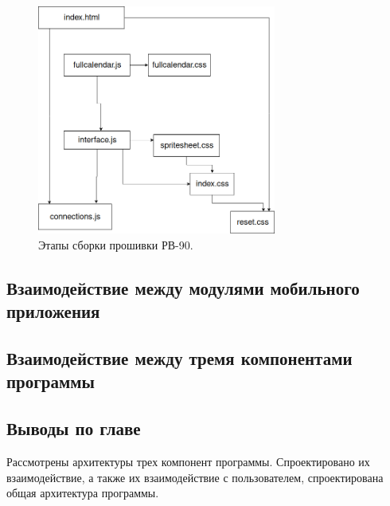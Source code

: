 \begin{figure}[h!]
    \centering
    \includegraphics[width=0.7\textwidth]{webapp_modules_hierarchy.png}
    \caption{Этапы сборки прошивки РВ-90.}
\end{figure}


\newpage
\subsection{Взаимодействие между модулями мобильного приложения}







\newpage
\subsection{Взаимодействие между тремя компонентами программы}







\newpage
\subsection{Выводы по главе}
Рассмотрены архитектуры трех компонент программы. Спроектировано их взаимодействие, а также их взаимодействие с пользователем, спроектирована общая архитектура программы.

